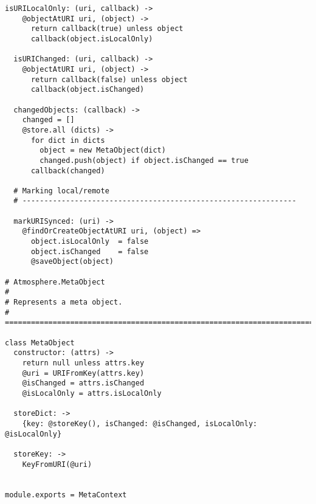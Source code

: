\begin{lstlisting}[caption=meta_context.coffee]
  isURILocalOnly: (uri, callback) ->
    @objectAtURI uri, (object) ->
      return callback(true) unless object
      callback(object.isLocalOnly)
  
  isURIChanged: (uri, callback) ->
    @objectAtURI uri, (object) ->
      return callback(false) unless object
      callback(object.isChanged)
  
  changedObjects: (callback) ->
    changed = []
    @store.all (dicts) ->
      for dict in dicts
        object = new MetaObject(dict)
        changed.push(object) if object.isChanged == true
      callback(changed)
  
  # Marking local/remote
  # ---------------------------------------------------------------
  
  markURISynced: (uri) ->
    @findOrCreateObjectAtURI uri, (object) =>
      object.isLocalOnly  = false
      object.isChanged    = false
      @saveObject(object)

# Atmosphere.MetaObject
#
# Represents a meta object.
# =============================================================================  

class MetaObject
  constructor: (attrs) ->
    return null unless attrs.key
    @uri = URIFromKey(attrs.key)
    @isChanged = attrs.isChanged
    @isLocalOnly = attrs.isLocalOnly
  
  storeDict: ->
    {key: @storeKey(), isChanged: @isChanged, isLocalOnly: @isLocalOnly}
  
  storeKey: ->
    KeyFromURI(@uri)
    

module.exports = MetaContext
\end{lstlisting}


